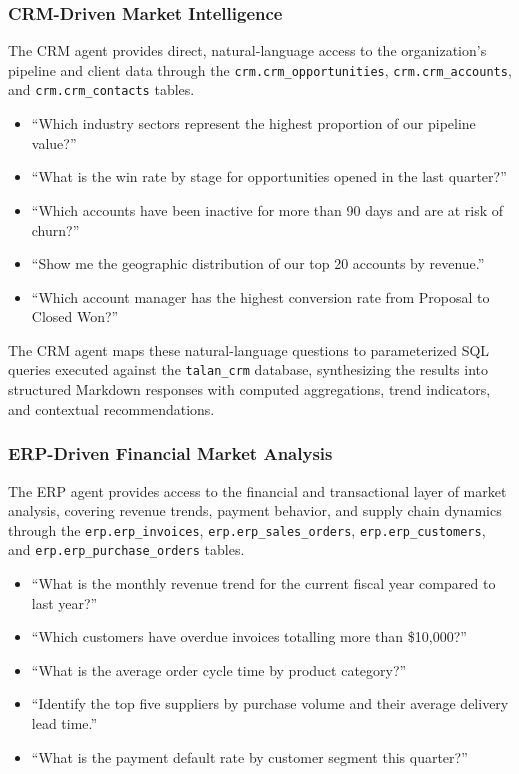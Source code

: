 \documentclass[12pt,a4paper]{report}
\begin{document}
\subsubsection{CRM-Driven Market Intelligence}

The CRM agent provides direct, natural-language access to the organization's pipeline and client
data through the \texttt{crm.crm\_opportunities}, \texttt{crm.crm\_accounts}, and
\texttt{crm.crm\_contacts} tables.

\begin{insightbox}
\begin{itemize}[leftmargin=1.2em]
  \item ``Which industry sectors represent the highest proportion of our pipeline value?''
  \item ``What is the win rate by stage for opportunities opened in the last quarter?''
  \item ``Which accounts have been inactive for more than 90 days and are at risk of churn?''
  \item ``Show me the geographic distribution of our top 20 accounts by revenue.''
  \item ``Which account manager has the highest conversion rate from Proposal to Closed Won?''
\end{itemize}
\end{insightbox}

The CRM agent maps these natural-language questions to parameterized SQL queries executed against
the \texttt{talan\_crm} database, synthesizing the results into structured Markdown responses with
computed aggregations, trend indicators, and contextual recommendations.

\subsubsection{ERP-Driven Financial Market Analysis}

The ERP agent provides access to the financial and transactional layer of market analysis, covering
revenue trends, payment behavior, and supply chain dynamics through the
\texttt{erp.erp\_invoices}, \texttt{erp.erp\_sales\_orders}, \texttt{erp.erp\_customers},
and \texttt{erp.erp\_purchase\_orders} tables.

\begin{insightbox}
\begin{itemize}[leftmargin=1.2em]
  \item ``What is the monthly revenue trend for the current fiscal year compared to last year?''
  \item ``Which customers have overdue invoices totalling more than \$10{,}000?''
  \item ``What is the average order cycle time by product category?''
  \item ``Identify the top five suppliers by purchase volume and their average delivery lead
    time.''
  \item ``What is the payment default rate by customer segment this quarter?''
\end{itemize}
\end{insightbox}
\end{document}
